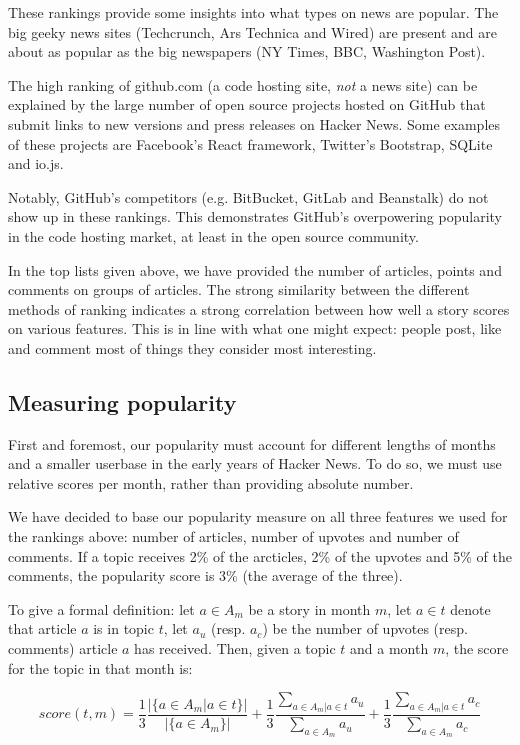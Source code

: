 These rankings provide some insights into what types on news are popular. The big geeky news sites (Techcrunch, Ars Technica and Wired) are present and are about as popular as the big newspapers (NY Times, BBC, Washington Post). 

The high ranking of github.com (a code hosting site, \textit{not} a news site) can be explained by the large number of open source projects hosted on GitHub that submit links to new versions and press releases on Hacker News. Some examples of these projects are Facebook's React framework, Twitter's Bootstrap, SQLite and io.js. 

Notably, GitHub's competitors (e.g. BitBucket, GitLab and Beanstalk) do not show up in these rankings. This demonstrates GitHub's overpowering popularity in the code hosting market, at least in the open source community.

In the top lists given above, we have provided the number of articles, points and comments on groups of articles. The strong similarity between the different methods of ranking indicates a strong correlation between how well a story scores on various features. This is in line with what one might expect: people post, like and comment most of things they consider most interesting.

\subsection{Measuring popularity}
First and foremost, our popularity must account for different lengths of months and a smaller userbase in the early years of Hacker News. To do so, we must use relative scores per month, rather than providing absolute number.

We have decided to base our popularity measure on all three features we used for the rankings above: number of articles, number of upvotes and number of comments. If a topic receives 2\% of the arcticles, 2\% of the upvotes and 5\% of the comments, the popularity score is 3\% (the average of the three).

To give a formal definition: let $a \in A_m$ be a story in month $m$, let $a \in t$ denote that article $a$ is in topic $t$, let $a_u$ (resp. $a_c$) be the number of upvotes (resp. comments) article $a$ has received. Then, given a topic $t$ and a month $m$, the score for the topic in that month is:

$$
	score(t, m) = 
		\frac{1}{3} \frac{|\{a \in A_m | a \in t\}|}{|\{a \in A_m\}|} + 
		\frac{1}{3} \frac{\sum_{a \in A_m | a \in t} a_u}{\sum_{a \in A_m} a_u}  + 
		\frac{1}{3} \frac{\sum_{a \in A_m | a \in t} a_c}{\sum_{a \in A_m} a_c}
$$
